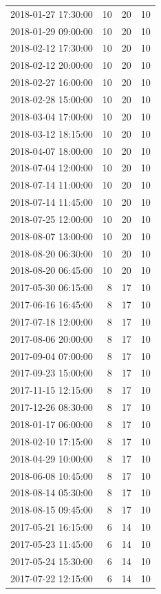 \begin{tabular}{lrrr}
2018-01-27 17:30:00 & 10 & 20 & 10 \\
2018-01-29 09:00:00 & 10 & 20 & 10 \\
2018-02-12 17:30:00 & 10 & 20 & 10 \\
2018-02-12 20:00:00 & 10 & 20 & 10 \\
2018-02-27 16:00:00 & 10 & 20 & 10 \\
2018-02-28 15:00:00 & 10 & 20 & 10 \\
2018-03-04 17:00:00 & 10 & 20 & 10 \\
2018-03-12 18:15:00 & 10 & 20 & 10 \\
2018-04-07 18:00:00 & 10 & 20 & 10 \\
2018-07-04 12:00:00 & 10 & 20 & 10 \\
2018-07-14 11:00:00 & 10 & 20 & 10 \\
2018-07-14 11:45:00 & 10 & 20 & 10 \\
2018-07-25 12:00:00 & 10 & 20 & 10 \\
2018-08-07 13:00:00 & 10 & 20 & 10 \\
2018-08-20 06:30:00 & 10 & 20 & 10 \\
2018-08-20 06:45:00 & 10 & 20 & 10 \\
2017-05-30 06:15:00 & 8 & 17 & 10 \\
2017-06-16 16:45:00 & 8 & 17 & 10 \\
2017-07-18 12:00:00 & 8 & 17 & 10 \\
2017-08-06 20:00:00 & 8 & 17 & 10 \\
2017-09-04 07:00:00 & 8 & 17 & 10 \\
2017-09-23 15:00:00 & 8 & 17 & 10 \\
2017-11-15 12:15:00 & 8 & 17 & 10 \\
2017-12-26 08:30:00 & 8 & 17 & 10 \\
2018-01-17 06:00:00 & 8 & 17 & 10 \\
2018-02-10 17:15:00 & 8 & 17 & 10 \\
2018-04-29 10:00:00 & 8 & 17 & 10 \\
2018-06-08 10:45:00 & 8 & 17 & 10 \\
2018-08-14 05:30:00 & 8 & 17 & 10 \\
2018-08-15 09:45:00 & 8 & 17 & 10 \\
2017-05-21 16:15:00 & 6 & 14 & 10 \\
2017-05-23 11:45:00 & 6 & 14 & 10 \\
2017-05-24 15:30:00 & 6 & 14 & 10 \\
2017-07-22 12:15:00 & 6 & 14 & 10 \\

\end{tabular}
